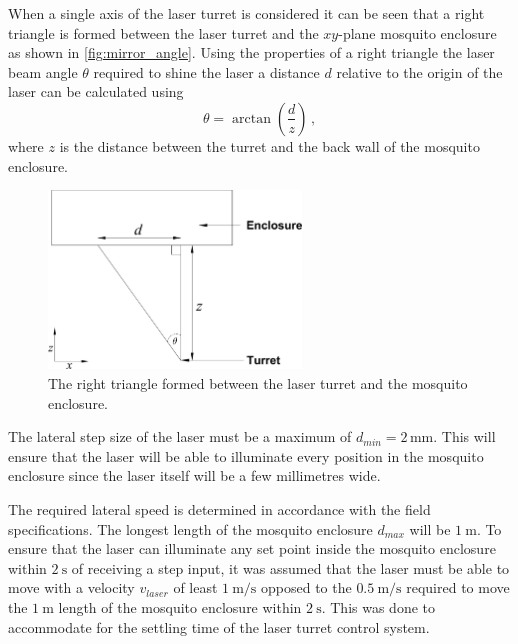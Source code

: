 When a single axis of the laser turret is considered it can be seen that a right triangle is formed between the laser turret and the $xy$-plane mosquito enclosure as shown in \autoref{fig:mirror_angle}. Using the properties of a right triangle the laser beam angle $\theta$ required to shine the laser a distance $d$ relative to the origin of the laser can be calculated using
\begin{equation}
  \theta = \arctan{\left(\frac{d}{z}\right)}\,,
  \label{eq:mirror_angle}
\end{equation}
where $z$ is the distance between the turret and the back wall of the mosquito enclosure.
\begin{figure}[!htb]
  \centering
  \includegraphics[width=0.6\textwidth]{figures/hardware_design/mirror_angle.pdf}
  \caption{The right triangle formed between the laser turret and the mosquito enclosure.}
  \label{fig:mirror_angle}
\end{figure}

\newcommand{\requiredLatStepSizeMM}{2}
The lateral step size of the laser must be a maximum of $d_{min} = \requiredLatStepSizeMM$\,mm. This will ensure that the laser will be able to illuminate every position in the mosquito enclosure since the laser itself will be a few millimetres wide.

\newcommand{\requiredLatSpeedMPS}{1}
The required lateral speed is determined in accordance with the field specifications. The longest length of the mosquito enclosure $d_{max}$ will be $\SI{1}{\meter}$. To ensure that the laser can illuminate any set point inside the mosquito enclosure within $\SI{2}{\second}$ of receiving a step input, it was assumed that the laser must be able to move with a velocity $v_{laser}$ of least $\SI{\requiredLatSpeedMPS}{\meter\per\second}$ opposed to the $\SI{0.5}{\meter\per\second}$ required to move the $\SI{1}{\meter}$ length of the mosquito enclosure within $\SI{2}{\second}$. This was done to accommodate for the settling time of the laser turret control system.




